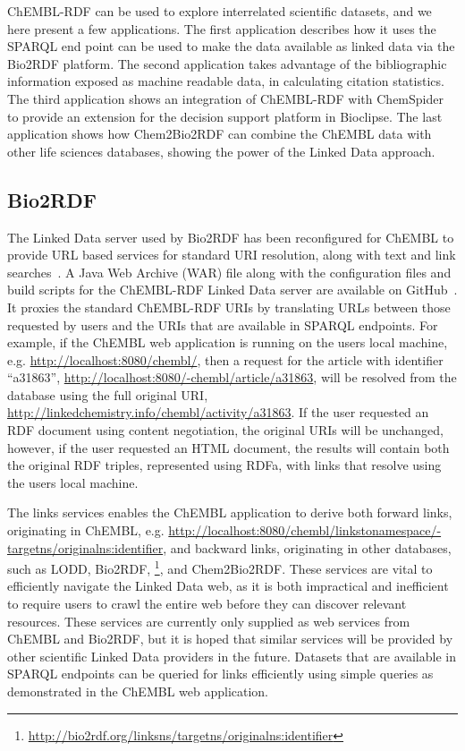 \documentclass[10pt]{bmc_article}
\newenvironment{bmcformat}{\begin{raggedright}\baselineskip20pt\sloppy\setboolean{publ}{false}}{\end{raggedright}\baselineskip20pt\sloppy}
\begin{document}
\begin{bmcformat}
ChEMBL-RDF can be used to explore interrelated scientific datasets, and we here present a few applications. 
The first application describes how it uses the SPARQL end point can be used to make the data available as linked data
via the Bio2RDF platform. The second application takes advantage of the bibliographic information
exposed as machine readable data, in calculating citation statistics. The third application shows
an integration of ChEMBL-RDF with ChemSpider to provide an extension for the decision support
platform in Bioclipse. The last application shows how Chem2Bio2RDF can combine the ChEMBL data
with other life sciences databases, showing the power of the Linked Data approach.

\subsection*{Bio2RDF}

The Linked Data server used by Bio2RDF has been reconfigured for ChEMBL to provide URL
based services for standard URI resolution, along with text and link searches~\cite{Ansell2011}. 
A Java Web Archive (WAR) file along with the configuration files and build scripts for the ChEMBL-RDF Linked Data server are available on GitHub~\cite{WebAppGitHub}. 
It proxies the standard ChEMBL-RDF URIs by translating URLs between those requested by users and the URIs that are available
in SPARQL endpoints. For example, if the ChEMBL web application is running on the users
local machine, e.g. \url{http://localhost:8080/chembl/}, then a request for the
article with identifier ``a31863'', \url{http://localhost:8080/-chembl/article/a31863},
will be resolved from the database using the full original URI,
\url{http://linkedchemistry.info/chembl/activity/a31863}. If the
user requested an RDF document using content negotiation, the original URIs will be unchanged,
however, if the user requested an HTML document, the results will contain both the
original RDF triples, represented using RDFa, with links that resolve using the users local machine.

The links services enables the ChEMBL application to derive both forward links, originating in
ChEMBL, e.g. \url{http://localhost:8080/chembl/linkstonamespace/-targetns/originalns:identifier},
and backward links, originating in other databases, such as LODD, Bio2RDF,
\footnote{\url{http://bio2rdf.org/linksns/targetns/originalns:identifier}}, and Chem2Bio2RDF.
These services are vital to efficiently navigate the Linked Data web, as it is both
impractical and inefficient to require users to crawl the entire web before they can discover 
relevant resources. These services are currently only supplied as web services from ChEMBL and
Bio2RDF, but it is hoped that similar services will be provided by other scientific Linked Data
providers in the future. Datasets that are available in SPARQL endpoints can be queried for
links efficiently using simple queries as demonstrated in the ChEMBL web application.


\end{bmcformat}
\end{document}
